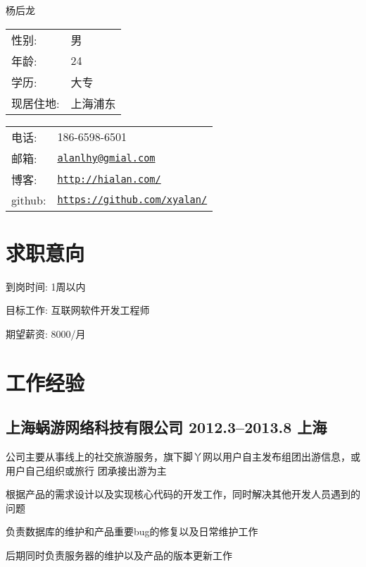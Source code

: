\documentclass[11pt,a4paper]{article}
\def\name{杨后龙}
\renewenvironment{itemize}{
  \begin{list}{}{
    \setlength{\leftmargin}{1.5em}
  }
}{
  \end{list}
}
\begin{document}
{\huge \name}


\vspace{0.25in}

\begin{minipage}{0.45\linewidth}
  \begin{tabular}{ll}
    性别: & 男\\
    年龄: & 24\\
    学历: & 大专 \\
    现居住地: & 上海浦东 \\
  \end{tabular}
\end{minipage}
\begin{minipage}{0.45\linewidth}
  \begin{tabular}{ll}
    电话: & 186-6598-6501 \\
    邮箱: & \href{mailto:alanlhy@gmail.com}{\tt alanlhy@gmial.com} \\
    博客: & \href{http://hialan.com/}{\tt http://hialan.com/} \\
    github: & \href{https://github.com/xyalan}{\tt https://github.com/xyalan/} \\
  \end{tabular}
\end{minipage}


\section*{求职意向}

\begin{itemize}
\item 到岗时间: 1周以内
\item 目标工作: 互联网软件开发工程师
\item 期望薪资: 8000/月
\end{itemize}


\section*{工作经验}

\subsection*{上海蜗游网络科技有限公司 2012.3--2013.8 上海}

\begin{itemize}
  \item 公司主要从事线上的社交旅游服务，旗下脚丫网以用户自主发布组团出游信息，或用户自己组织或旅行
    团承接出游为主
  \item 根据产品的需求设计以及实现核心代码的开发工作，同时解决其他开发人员遇到的问题
  \item 负责数据库的维护和产品重要bug的修复以及日常维护工作
  \item 后期同时负责服务器的维护以及产品的版本更新工作
\end{itemize}
\end{document}
